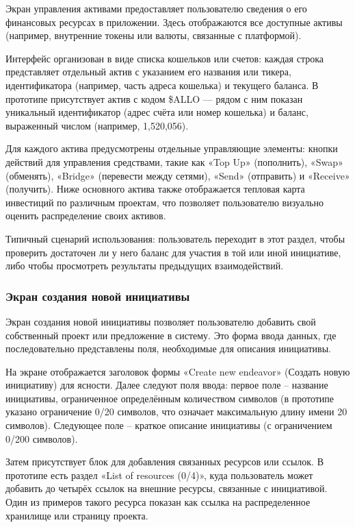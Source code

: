 \documentclass[
    candidate, %
    subf, %
    dotsinheaders=false,
]{disser}
\begin{document}
Экран управления активами предоставляет пользователю сведения о его финансовых ресурсах в приложении. Здесь отображаются все доступные активы (например, внутренние токены или валюты, связанные с платформой).

Интерфейс организован в виде списка кошельков или счетов: каждая строка представляет отдельный актив с указанием его названия или тикера, идентификатора (например, часть адреса кошелька) и текущего баланса. В прототипе присутствует актив с кодом \$ALLO — рядом с ним показан уникальный идентификатор (адрес счёта или номер кошелька) и баланс, выраженный числом (например, 1,520,056).

Для каждого актива предусмотрены отдельные управляющие элементы: кнопки действий для управления средствами, такие как «Top Up» (пополнить), «Swap» (обменять), «Bridge» (перевести между сетями), «Send» (отправить) и «Receive» (получить). Ниже основного актива также отображается тепловая карта инвестиций по различным проектам, что позволяет пользователю визуально оценить распределение своих активов.

Типичный сценарий использования: пользователь переходит в этот раздел, чтобы проверить достаточен ли у него баланс для участия в той или иной инициативе, либо чтобы просмотреть результаты предыдущих взаимодействий.

\subsubsection{Экран создания новой инициативы}

Экран создания новой инициативы позволяет пользователю добавить свой собственный проект или предложение в систему. Это форма ввода данных, где последовательно представлены поля, необходимые для описания инициативы.

На экране отображается заголовок формы «Create new endeavor» (Создать новую инициативу) для ясности. Далее следуют поля ввода: первое поле – название инициативы, ограниченное определённым количеством символов (в прототипе указано ограничение 0/20 символов, что означает максимальную длину имени 20 символов). Следующее поле – краткое описание инициативы (с ограничением 0/200 символов).

Затем присутствует блок для добавления связанных ресурсов или ссылок. В прототипе есть раздел «List of resources (0/4)», куда пользователь может добавить до четырёх ссылок на внешние ресурсы, связанные с инициативой. Один из примеров такого ресурса показан как ссылка на распределенное хранилище или страницу проекта.
\end{document}
